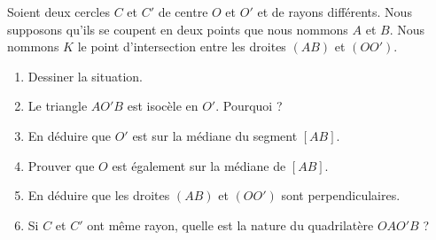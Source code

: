 
\begin{exercice}\label{exoSeconde-0100}

    Soient deux cercles \( C\) et \( C'\) de centre \( O\) et \( O'\) et de rayons différents. Nous supposons qu'ils se coupent en deux points que nous nommons \( A\) et \( B\). Nous nommons \( K\) le point d'intersection entre les droites \( (AB)\) et \( (OO')\).
    \begin{multicols}{2}
        \begin{enumerate}
        \item
            Dessiner la situation.
        \item
            Le triangle \( AO'B\) est isocèle en \( O'\). Pourquoi ?
        \item
            En déduire que \( O'\) est sur la médiane du segment \( [AB]\).
        \item
            Prouver que \( O\) est également sur la médiane de \( [AB]\).
        \item
            En déduire que les droites \( (AB)\) et \( (OO')\) sont perpendiculaires.
        \item
            Si \( C\) et \( C'\) ont même rayon, quelle est la nature du quadrilatère \( OAO'B\) ?
    \end{enumerate}
    \end{multicols}

\end{exercice}
